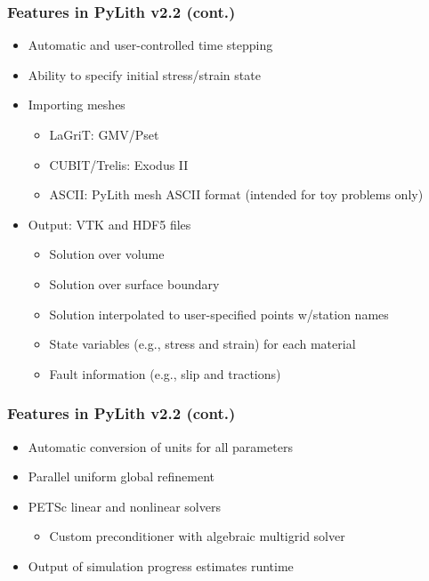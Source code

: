 \documentclass[aspectratio=169]{beamer}
\begin{document}
\begin{frame}
  \frametitle{Features in PyLith v2.2 (cont.)}
  \summary{}

  \begin{itemize}
  \item Automatic and user-controlled time stepping
  \item Ability to specify initial stress/strain state
  \item Importing meshes
    \begin{itemize}
    \item LaGriT: GMV/Pset
    \item CUBIT/Trelis: Exodus II
    \item ASCII: PyLith mesh ASCII format (intended for toy problems only)
    \end{itemize}
  \item Output: VTK and HDF5 files
    \begin{itemize}
    \item Solution over volume
    \item Solution over surface boundary
    \item Solution interpolated to user-specified points w/station names
    \item State variables (e.g., stress and strain) for each material
    \item Fault information (e.g., slip and tractions)
    \end{itemize}
 \end{itemize}
  
\end{frame}


\begin{frame}
  \frametitle{Features in PyLith v2.2 (cont.)}
  \summary{}

  \begin{itemize}
  \item Automatic conversion of units for all parameters
  \item Parallel uniform global refinement
  \item PETSc linear and nonlinear solvers
    \begin{itemize}
    \item Custom preconditioner with algebraic multigrid solver
    \end{itemize}
  \item Output of simulation progress estimates runtime
 \end{itemize}
  
\end{frame}
\end{document}
